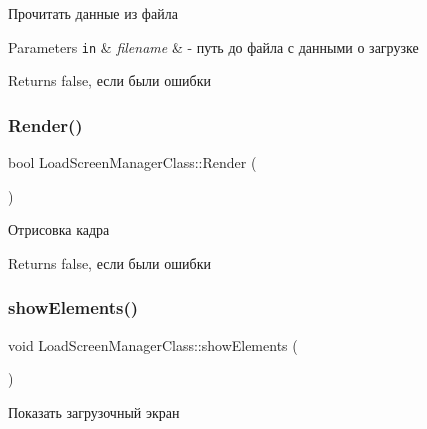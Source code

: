 Прочитать данные из файла 


\begin{DoxyParams}[1]{Parameters}
\mbox{\tt in}  & {\em filename} & -\/ путь до файла с данными о загрузке \\
\hline
\end{DoxyParams}
\begin{DoxyReturn}{Returns}
false, если были ошибки 
\end{DoxyReturn}
\mbox{\label{class_load_screen_manager_class_ac173d29a91243ee9ef7bd4342cdcd4f8}} 
\subsubsection{\texorpdfstring{Render()}{Render()}}
{\footnotesize\ttfamily bool Load\+Screen\+Manager\+Class\+::\+Render (\begin{DoxyParamCaption}{ }\end{DoxyParamCaption})}



Отрисовка кадра 

\begin{DoxyReturn}{Returns}
false, если были ошибки 
\end{DoxyReturn}
\mbox{\label{class_load_screen_manager_class_afe8b77ac62afe178004df020bee92385}} 
\subsubsection{\texorpdfstring{show\+Elements()}{showElements()}}
{\footnotesize\ttfamily void Load\+Screen\+Manager\+Class\+::show\+Elements (\begin{DoxyParamCaption}{ }\end{DoxyParamCaption})}



Показать загрузочный экран 

\mbox{\label{class_load_screen_manager_class_adde192a99094683d3193c37935d3ddd0}} 
